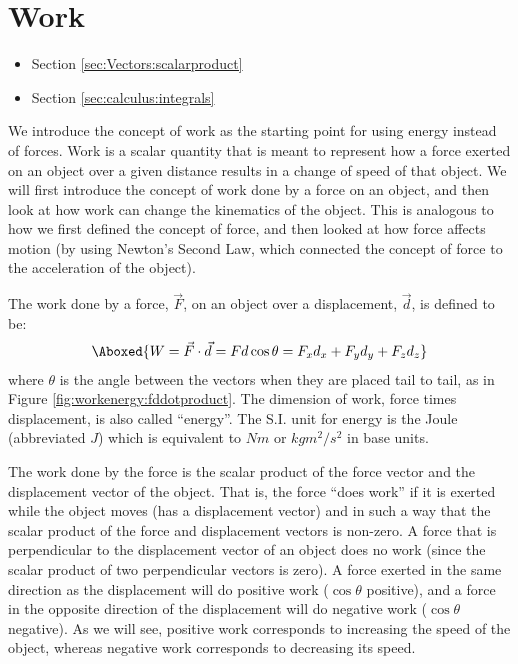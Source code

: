 \section{Work}
\begin{review}
\begin{itemize}
\item Section \ref{sec:Vectors:scalarproduct}
\item Section \ref{sec:calculus:integrals}
\end{itemize}
\end{review}
We introduce the concept of work as the starting point for using energy instead of forces. Work is a scalar quantity that is meant to represent how a force exerted on an object over a given distance results in a change of speed of that object. We will first introduce the concept of work done by a force on an object, and then look at how work can change the kinematics of the object. This is analogous to how we first defined the concept of force, and then looked at how force affects motion (by using Newton's Second Law, which connected the concept of force to the acceleration of the object).

The work done by a force, $\vec F$, on an object over a displacement, $\vec d$, is defined to be:
\begin{align}
\Aboxed{W = \vec F \cdot \vec d = Fd\cos\theta = F_xd_x+F_yd_y+F_zd_z}
\end{align}
where $\theta$ is the angle between the vectors when they are placed tail to tail, as in Figure \ref{fig:workenergy:fddotproduct}. The dimension of work, force times displacement, is also called ``energy''. The S.I. unit for energy is the Joule (abbreviated $\si{J}$) which is equivalent to $\si{Nm}$ or $\si{kg m^2/s^2}$ in base units.

The work done by the force is the scalar product of the force vector and the displacement vector of the object. That is, the force ``does work'' if it is exerted while the object moves (has a displacement vector) and in such a way that the scalar product of the force and displacement vectors is non-zero. A force that is perpendicular to the displacement vector of an object does no work (since the scalar product of two perpendicular vectors is zero).  A force exerted in the same direction as the displacement will do positive work ($\cos\theta$ positive), and a force in the opposite direction of the displacement will do negative work ($\cos\theta$ negative). As we will see, positive work corresponds to increasing the speed of the object, whereas negative work corresponds to decreasing its speed.

